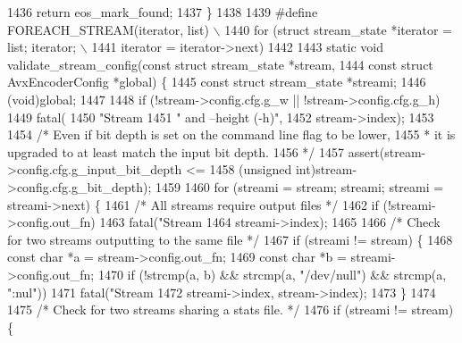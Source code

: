 \begin{DoxyCodeInclude}
{{{{{{{{{{{{{{{{{{{1436   \textcolor{keywordflow}{return} eos\_mark\_found;
1437 \}
1438 
1439 \textcolor{preprocessor}{#define FOREACH\_STREAM(iterator, list)                 \(\backslash\)}
1440 \textcolor{preprocessor}{  for (struct stream\_state *iterator = list; iterator; \(\backslash\)}
1441 \textcolor{preprocessor}{       iterator = iterator->next)}
1442 
1443 \textcolor{keyword}{static} \textcolor{keywordtype}{void} validate\_stream\_config(\textcolor{keyword}{const} \textcolor{keyword}{struct} stream\_state *stream,
1444                                    \textcolor{keyword}{const} \textcolor{keyword}{struct} AvxEncoderConfig *global) \{
1445   \textcolor{keyword}{const} \textcolor{keyword}{struct }stream\_state *streami;
1446   (void)global;
1447 
1448   \textcolor{keywordflow}{if} (!stream->config.cfg.g\_w || !stream->config.cfg.g\_h)
1449     fatal(
1450         \textcolor{stringliteral}{"Stream %
1451         \textcolor{stringliteral}{" and --height (-h)"},
1452         stream->index);
1453 
1454   \textcolor{comment}{/* Even if bit depth is set on the command line flag to be lower,}
1455 \textcolor{comment}{   * it is upgraded to at least match the input bit depth.}
1456 \textcolor{comment}{   */}
1457   assert(stream->config.cfg.g\_input\_bit\_depth <=
1458          (\textcolor{keywordtype}{unsigned} \textcolor{keywordtype}{int})stream->config.cfg.g\_bit\_depth);
1459 
1460   \textcolor{keywordflow}{for} (streami = stream; streami; streami = streami->next) \{
1461     \textcolor{comment}{/* All streams require output files */}
1462     \textcolor{keywordflow}{if} (!streami->config.out\_fn)
1463       fatal(\textcolor{stringliteral}{"Stream %
1464             streami->index);
1465 
1466     \textcolor{comment}{/* Check for two streams outputting to the same file */}
1467     \textcolor{keywordflow}{if} (streami != stream) \{
1468       \textcolor{keyword}{const} \textcolor{keywordtype}{char} *a = stream->config.out\_fn;
1469       \textcolor{keyword}{const} \textcolor{keywordtype}{char} *b = streami->config.out\_fn;
1470       \textcolor{keywordflow}{if} (!strcmp(a, b) && strcmp(a, \textcolor{stringliteral}{"/dev/null"}) && strcmp(a, \textcolor{stringliteral}{":nul"}))
1471         fatal(\textcolor{stringliteral}{"Stream %
1472               streami->index, stream->index);
1473     \}
1474 
1475     \textcolor{comment}{/* Check for two streams sharing a stats file. */}
1476     \textcolor{keywordflow}{if} (streami != stream) \{
}}}}}}}}}}}}}}}}}}}}}}
\end{DoxyCodeInclude}
